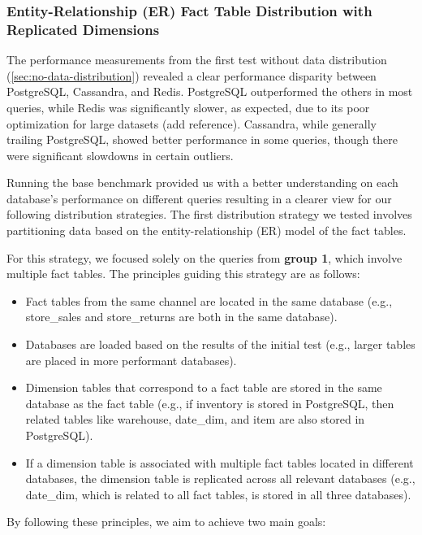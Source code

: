 \documentclass[conference]{IEEEtran}
\begin{document}
\subsubsection{Entity-Relationship (ER) Fact Table Distribution with Replicated Dimensions}
\label{sec:er-fact-table-distro}

The performance measurements from the first test without data distribution (\ref{sec:no-data-distribution})
revealed a clear performance disparity between PostgreSQL, Cassandra, and Redis. PostgreSQL outperformed
the others in most queries, while Redis was significantly slower, as expected, due to its poor optimization
for large datasets (add reference). Cassandra, while generally trailing PostgreSQL, showed better performance
in some queries, though there were significant slowdowns in certain outliers.

Running the base benchmark provided us with a better understanding on each database's performance on
different queries resulting in a clearer view for our following distribution strategies.
The first distribution strategy we tested involves partitioning data based on the entity-relationship
(ER) model of the fact tables.

For this strategy, we focused solely on the queries from \textbf{group 1}, which involve multiple fact tables.
The principles guiding this strategy are as follows:
\begin{itemize}
	\item Fact tables from the same channel are located in the same database (e.g., store\_sales and store\_returns are both in the same database).
	\item Databases are loaded based on the results of the initial test (e.g., larger tables are placed in more performant databases).
	\item Dimension tables that correspond to a fact table are stored in the same database as the fact table (e.g., if inventory is stored in PostgreSQL, then related tables like warehouse, date\_dim, and item are also stored in PostgreSQL).
	\item If a dimension table is associated with multiple fact tables located in different databases, the dimension table is replicated across all relevant databases (e.g., date\_dim, which is related to all fact tables, is stored in all three databases).
\end{itemize}

By following these principles, we aim to achieve two main goals:
\end{document}
